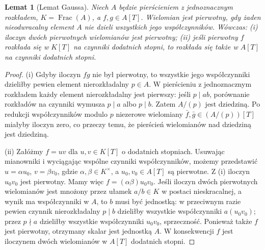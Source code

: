 \documentclass[11pt,a4paper,openany]{report}
\numberwithin{equation}{section}
\theoremstyle{plain}
\newtheorem{lemat}[twierdzenie]{Lemat}
\theoremstyle{definition}
\theoremstyle{remark}
\newcommand{\Frac}{\operatorname{Frac}}
\begin{document}
\begin{lemat}[Lemat Gaussa]
\label{lem:gauss-ufd}
Niech $A$ będzie pierścieniem z jednoznacznym rozkładem,
$K=\Frac(A)$, a $f,g\in A[T]$. Wielomian jest
\emph{pierwotny}, gdy żaden nieodwracalny element $A$
nie dzieli wszystkich jego współczynników.
Wówczas: (i) iloczyn dwóch pierwotnych wielomianów jest
pierwotny; (ii) jeśli pierwotny $f$ rozkłada się
w $K[T]$ na czynniki dodatnich stopni, to rozkłada się
także w $A[T]$ na czynniki dodatnich stopni.
\end{lemat}
\begin{proof}
(i) Gdyby iloczyn $fg$ nie był pierwotny, to wszystkie
jego współczynniki dzieliłby pewien element nierozkładalny
$p\in A$. W pierścieniu z jednoznacznym rozkładem każdy
element nierozkładalny jest pierwszy: jeśli $p\mid ab$,
porównanie rozkładów na czynniki wymusza $p\mid a$ albo
$p\mid b$. Zatem $A/(p)$ jest dziedziną.
Po redukcji współczynników modulo $p$ niezerowe
wielomiany $\bar f,\bar g\in(A/(p))[T]$ miałyby
iloczyn zero, co przeczy temu, że pierścień
wielomianów nad dziedziną jest dziedziną.

(ii) Załóżmy $f=uv$ dla $u,v\in K[T]$ o dodatnich stopniach.
Usuwając mianowniki i wyciągając wspólne czynniki
współczynników, możemy przedstawić
$u=\alpha u_0$, $v=\beta v_0$, gdzie
$\alpha,\beta\in K^\times$, a $u_0,v_0\in A[T]$
są pierwotne. Z (i) iloczyn $u_0v_0$ jest pierwotny.
Mamy więc $f=(\alpha\beta)u_0v_0$.
Jeśli iloczyn dwóch pierwotnych wielomianów jest mnożony
przez ułamek $a/b\in K$ w postaci nieskracalnej,
a wynik ma współczynniki w $A$, to $b$ musi być jednostką:
w przeciwnym razie pewien czynnik nierozkładalny $p\mid b$
dzieliłby wszystkie współczynniki $a(u_0v_0)$;
przez $p\nmid a$ dzieliłby wszystkie współczynniki
$u_0v_0$, sprzeczność. Ponieważ także $f$ jest
pierwotny, otrzymany skalar jest jednostką $A$.
W konsekwencji $f$ jest iloczynem dwóch wielomianów
w $A[T]$ dodatnich stopni.
\end{proof}
\end{document}
